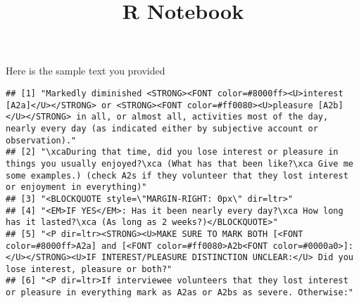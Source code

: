 \documentclass[
]{article}
\title{R Notebook}
\author{}
\date{\vspace{-2.5em}}
\newenvironment{Shaded}{\begin{snugshade}}{\end{snugshade}}
\newcommand{\CommentTok}[1]{\textcolor[rgb]{0.56,0.35,0.01}{\textit{#1}}}
\newcommand{\FunctionTok}[1]{\textcolor[rgb]{0.00,0.00,0.00}{#1}}
\newcommand{\NormalTok}[1]{#1}
\newcommand{\OtherTok}[1]{\textcolor[rgb]{0.56,0.35,0.01}{#1}}
\newcommand{\SpecialCharTok}[1]{\textcolor[rgb]{0.00,0.00,0.00}{#1}}
\newcommand{\StringTok}[1]{\textcolor[rgb]{0.31,0.60,0.02}{#1}}
\begin{document}
\maketitle

Here is the sample text you provided

\begin{Shaded}
\end{Shaded}

\begin{verbatim}
## [1] "Markedly diminished <STRONG><FONT color=#8000ff><U>interest [A2a]</U></STRONG> or <STRONG><FONT color=#ff0080><U>pleasure [A2b]</U></STRONG> in all, or almost all, activities most of the day, nearly every day (as indicated either by subjective account or observation)."
## [2] "\xcaDuring that time, did you lose interest or pleasure in things you usually enjoyed?\xca (What has that been like?\xca Give me some examples.) (check A2s if they volunteer that they lost interest or enjoyment in everything)"                                           
## [3] "<BLOCKQUOTE style=\"MARGIN-RIGHT: 0px\" dir=ltr>"                                                                                                                                                                                                                            
## [4] "<EM>IF YES</EM>: Has it been nearly every day?\xca How long has it lasted?\xca (As long as 2 weeks?)</BLOCKQUOTE>"                                                                                                                                                           
## [5] "<P dir=ltr><STRONG><U>MAKE SURE TO MARK BOTH [<FONT color=#8000ff>A2a] and [<FONT color=#ff0080>A2b<FONT color=#0000a0>]: </U></STRONG><U>IF INTEREST/PLEASURE DISTINCTION UNCLEAR:</U> Did you lose interest, pleasure or both?"                                            
## [6] "<P dir=ltr>If interviewee volunteers that they lost interest or pleasure in everything mark as A2as or A2bs as severe. Otherwise:"
\end{verbatim}
\end{document}
